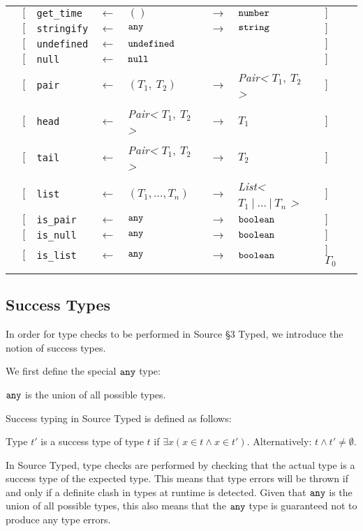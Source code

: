 \begin{tabular}[fragile]{lllllllll}
& $[$ & \texttt{get\_time} & $\leftarrow$  & $()$ & $\rightarrow$ & $\texttt{number}$ & $]$ \\
& $[$ & \texttt{stringify} & $\leftarrow$  & $\texttt{any}$ & $\rightarrow$ & $\texttt{string}$ & $]$ \\
& $[$ & \texttt{undefined} & $\leftarrow$  & $\texttt{undefined}$ & & & $]$ \\
& $[$ & \texttt{null}      & $\leftarrow$  & $\texttt{null}$ & & & $]$ \\
& $[$ & \texttt{pair} & $\leftarrow$  & $(T_1,\ T_2)$ & $\rightarrow$ & \textit{Pair<} $T_1,\ T_2$ \textit{>} & $]$ \\
& $[$ & \texttt{head} & $\leftarrow$  & \textit{Pair<} $T_1,\ T_2$ \textit{>} & $\rightarrow$ & $T_1$ & $]$ \\
& $[$ & \texttt{tail} & $\leftarrow$  & \textit{Pair<} $T_1,\ T_2$ \textit{>} & $\rightarrow$ & $T_2$ & $]$ \\
& $[$ & \texttt{list} & $\leftarrow$  & $(T_1, \ldots, T_n)$ & $\rightarrow$ & \textit{List<} $T_1\ |\ \ldots\ |\ T_n$ \textit{>} & $]$ \\
& $[$ & \texttt{is\_pair} & $\leftarrow$  & $\texttt{any}$ & $\rightarrow$ & $\texttt{boolean}$ & $]$ \\
& $[$ & \texttt{is\_null} & $\leftarrow$  & $\texttt{any}$ & $\rightarrow$ & $\texttt{boolean}$ & $]$ \\
& $[$ & \texttt{is\_list} & $\leftarrow$  & $\texttt{any}$ & $\rightarrow$ & $\texttt{boolean}$ & $]$ $\Gamma_0$ \\
& \end{tabular}

\subsection{Success Types}

In order for type checks to be performed in Source \S 3 Typed, we introduce the notion of success types.

We first define the special $\texttt{any}$ type:
\begin{definition}
$\texttt{any}$ is the union of all possible types.
\end{definition}

Success typing in Source Typed is defined as follows:

\begin{definition}
Type $t'$ is a success type of type $t$ if $\exists x (x \in t \wedge x \in t')$.
Alternatively: $t \wedge t' \neq \emptyset$.
\end{definition}

In Source Typed, type checks are performed by checking that the actual type is a success type of the expected type.
This means that type errors will be thrown if and only if a definite clash in types at runtime is detected.
Given that $\texttt{any}$ is the union of all possible types, this also means that the $\texttt{any}$ type is guaranteed not to produce any type errors.

